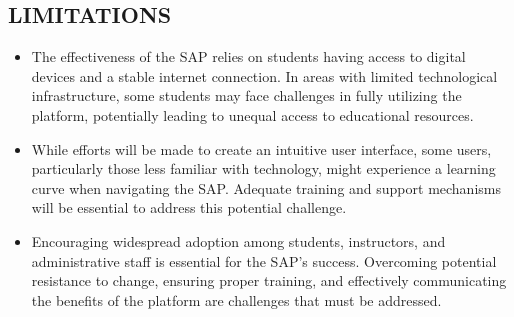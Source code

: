 \begin{center}
\section{LIMITATIONS}
\end{center}
\begin{itemize}
    \item The effectiveness of the SAP relies on students having access to digital devices and a stable internet connection. In areas with limited technological infrastructure, some students may face challenges in fully utilizing the platform, potentially leading to unequal access to educational resources.
    \item While efforts will be made to create an intuitive user interface, some users, particularly those less familiar with technology, might experience a learning curve when navigating the SAP. Adequate training and support mechanisms will be essential to address this potential challenge.
    \item Encouraging widespread adoption among students, instructors, and administrative staff is essential for the SAP's success. Overcoming potential resistance to change, ensuring proper training, and effectively communicating the benefits of the platform are challenges that must be addressed.
\end{itemize}
\newpage